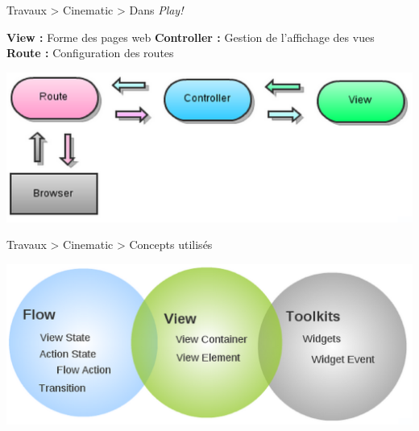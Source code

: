 \documentclass[HeilHazel,pdf,final,colorBG,slideColor]{prosper}
\begin{document}
\begin{slide}{Travaux > Cinematic > Dans \textit{Play!}}
\vspace{.5cm}
    \begin{Itemize}
    \itemg \textbf{View :} Forme des pages web
    \itemg \textbf{Controller :} Gestion de l'affichage des vues
    \itemg \textbf{Route :} Configuration des routes
    \end{Itemize}
    \bc{} 
      \includegraphics[scale=.3]{img/cinematic_play.eps} 
    \ec{}

\end{slide}


\begin{slide}{Travaux > Cinematic > Concepts utilisés}

  \bc{} 
    \includegraphics[scale=.3]{img/cinematic_concepts.eps} 
  \ec{}

\end{slide}
\end{document}

